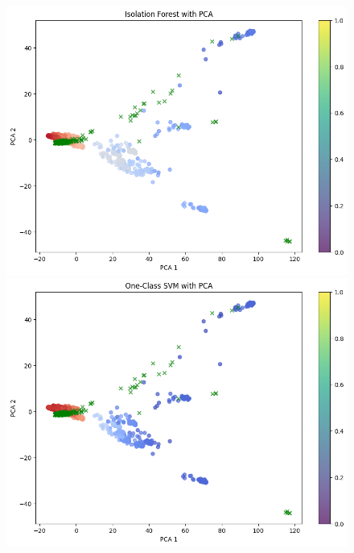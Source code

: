 \begin{figure}[ht]
  \centering
  \begin{minipage}[b]{0.45\linewidth}
    \centering
    \includegraphics[width=\linewidth]{Graphics/isolation_forest_PCA.png} %
  \end{minipage}
  \hspace{0.5cm} %
  \begin{minipage}[b]{0.45\linewidth}
    \centering
    \includegraphics[width=\linewidth]{Graphics/one_class_svm_PCA.png} %
  \end{minipage}
\end{figure}


